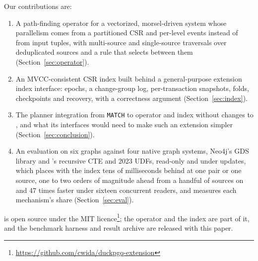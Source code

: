 Our contributions are:
\begin{enumerate}
  \item A path-finding operator for a vectorized, morsel-driven system whose parallelism comes from a partitioned
        CSR and per-level events instead of from input tuples, with multi-source and single-source traversals over
        deduplicated sources and a rule that selects between them (Section~\ref{sec:operator}).
  \item An MVCC-consistent CSR index built behind a general-purpose extension index interface: epochs, a change-group
        log, per-transaction snapshots, folds, checkpoints and recovery, with a correctness argument
        (Section~\ref{sec:index}).
  \item The planner integration from \sqlpgq \texttt{MATCH} to operator and index without changes to \duckdb, and what its interfaces would need to make such an extension simpler (Section~\ref{sec:conclusion}).
  \item An evaluation on six graphs against four native graph systems, Neo4j's GDS library and \duckdb's recursive
        CTE and 2023 UDFs, read-only and under updates, which places \duckdb with the index tens of milliseconds
        behind at one pair or one source, one to two orders of magnitude ahead from a handful of sources on and 47
        times faster under sixteen concurrent readers, and measures each mechanism's share (Section~\ref{sec:eval}).
\end{enumerate}
\duckpgq is open source under the MIT licence\footnote{\url{https://github.com/cwida/duckpgq-extension}}; the
operator and the index are part of it, and the benchmark harness and result archive are released with this paper.
